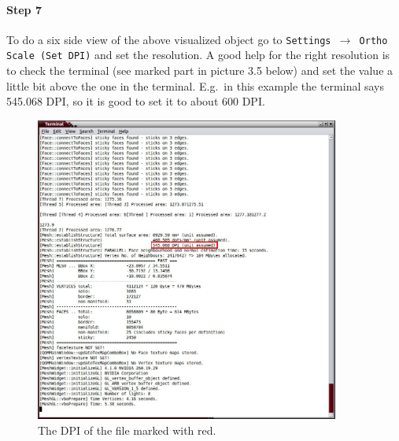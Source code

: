 \paragraph*{Step 7}
To do a six side view of the above visualized object go to \texttt{Settings $\rightarrow$ Ortho Scale (Set DPI)} and set the resolution. A good help for the right resolution is to check the terminal (see marked part in picture 3.5 below) and set the value a little bit above the one in the terminal. E.g.~in this example the terminal says 545.068 DPI, so it is good to set it to about 600 DPI.
\begin{figure}[H]
\begin{center}
    \includegraphics[width=10cm]{figs/Terminal02}
    \caption{The DPI of the file marked with red.}
\end{center}
\end{figure}

